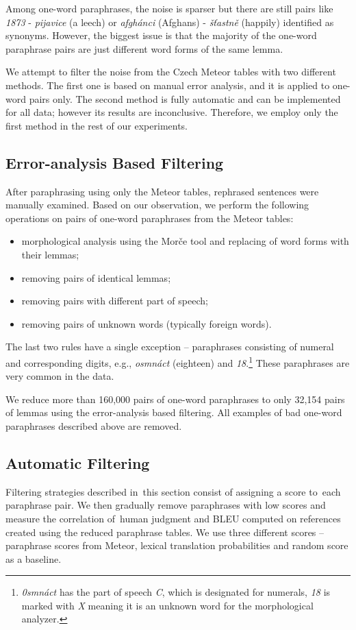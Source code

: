 Among one-word paraphrases, the noise is sparser but there are still pairs like \textit{1873} - \textit{pijavice} (a leech) or \textit{afgh\'{a}nci} (Afghans) - 
\textit{š\v{t}astně} (happily) identified as synonyms. 
However, the biggest issue is that the majority of the one-word paraphrase pairs are just different word forms of the same lemma.

We attempt to filter the noise from the Czech Meteor tables with two different methods. 
The first one is based on manual error analysis, and it is applied to one-word pairs only. 
The second method is fully automatic and can be implemented for all data; however its results are inconclusive. 
Therefore, we employ only the first method in the rest of our experiments.


\subsection{Error-analysis Based Filtering}
After paraphrasing using only the Meteor tables, rephrased sentences were manually examined. 
Based on our observation, we perform the following operations on pairs of one-word paraphrases from the Meteor tables:

\begin{itemize}
\item morphological analysis using the Morče tool \citep{morce:2007} and replacing of word forms with their lemmas; 
\item removing pairs of identical lemmas;
\item removing pairs with different part of speech;
\item removing pairs of unknown words (typically foreign words).
\end{itemize}

The last two rules have a single exception -- paraphrases consisting of numeral 
and corresponding digits, e.g., \textit{osmnáct} (eighteen) and \textit{18}.\footnote{
\textit{0smnáct} has the part of speech \textit{C}, which is designated for numerals, 
\textit{18} is marked with \textit{X} meaning it is an unknown word for the 
morphological analyzer.} These paraphrases are very common in the data. 

We reduce more than 160,000 pairs of one-word paraphrases to only 32,154 pairs of lemmas using the error-analysis based filtering. 
All examples of bad one-word paraphrases described above are removed.

\subsection{Automatic Filtering}
Filtering strategies described in~this section consist of assigning a score to~each paraphrase pair. 
We then gradually remove paraphrases with low scores and measure the correlation of~human judgment and BLEU computed on references created using the reduced paraphrase tables.
We use three different scores -- paraphrase scores from Meteor, lexical translation probabilities and random score as a baseline.

